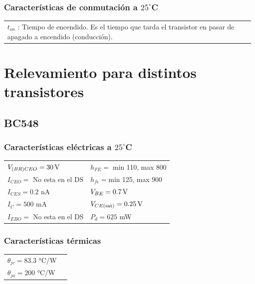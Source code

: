 \documentclass[chaptersright]{informeutn}
\begin{document}
\vspace{1em}
\subsubsection{Características de conmutación a $25^\circ$C}

\begin{tabular}{p{14cm}}
    $t_{on}$ : Tiempo de encendido. Es el tiempo que tarda el transistor en pasar de apagado a encendido (conducción). \\
\end{tabular}

  \section{Relevamiento para distintos transistores}

    \subsection{BC548}
  
    \subsubsection{Características eléctricas a $25^\circ$C}
    \begin{tabular}{ll}
    $V_{(BR)CEO} = 30 \,\mathrm{V}$         & \hspace{2cm} $h_{FE} =$ min 110, max 800 \\
    $I_{CEO} = $ No esta en el DS           & \hspace{2cm} $h_{fe} = $min 125, max 900 \\
    $I_{CES} = 0.2 $ nA             & \hspace{2cm} $V_{BE} = 0.7 \,\mathrm{V} $ \\
    $I_C = 500$ mA                & \hspace{2cm} $V_{CE(\text{sat})} =0.25 \,\mathrm{V} $ \\
    $I_{EBO} = $ No esta en el DS             & \hspace{2cm} $P_d = 625$ mW \\
    \end{tabular}
    
    \subsubsection{Características térmicas}
    \begin{tabular}{ll}
    $\theta_{jc} = 83.3$ °C/W \\
    $\theta_{ja} = 200$ °C/W\\
    \end{tabular}
    
\end{document}
